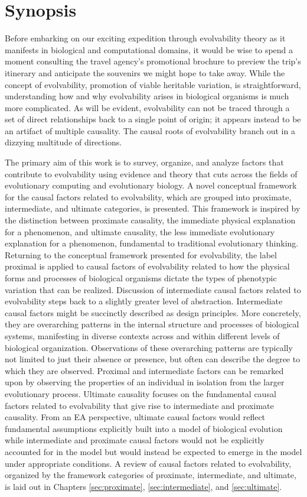 \section{Synopsis}

Before embarking on our exciting expedition through evolvability theory as it manifests in biological and computational domains, it would be wise to spend a moment consulting the travel agency's promotional brochure to preview the trip's itinerary and anticipate the souvenirs we might hope to take away.
While the concept of evolvability, promotion of viable heritable variation, is straightforward, understanding how and why evolvability arises in biological organisms is much more complicated.
As will be evident, evolvability can not be traced through a set of direct relationships back to a single point of origin; it appears instead to be an artifact of multiple causality.
The causal roots of evolvability branch out in a dizzying multitude of directions.

The primary aim of this work is to survey, organize, and analyze factors that contribute to evolvability using evidence and theory that cuts across the fields of evolutionary computing and evolutionary biology.
A novel conceptual framework for the causal factors related to evolvability,
which are grouped into proximate, intermediate, and ultimate categories, is presented.
This framework is inspired by the distinction between proximate causality, the immediate physical explanation for a phenomenon, and ultimate causality, the less immediate evolutionary explanation for a phenomenon, fundamental to traditional evolutionary thinking.
Returning to the conceptual framework presented for evolvability, the label proximal is applied to causal factors of evolvability related to how the physical forms and processes of biological organisms dictate the types of phenotypic variation that can be realized.
Discussion of intermediate causal factors related to evolvability steps back to a slightly greater level of abstraction.
Intermediate causal factors might be succinctly described as design principles.
More concretely, they are overarching patterns in the internal structure and processes of biological systems, manifesting in diverse contexts across and within different levels of biological organization.
Observations of these overarching patterns are typically not limited to just their absence or presence, but often can describe the degree to which they are observed.
Proximal and intermediate factors can be remarked upon by observing the properties of an individual in isolation from the larger evolutionary process.
Ultimate causality focuses on the fundamental causal factors related to evolvability that give rise to intermediate and proximate causality.
From an EA perspective, ultimate causal factors would reflect fundamental assumptions explicitly built into a model of biological evolution while intermediate and proximate causal factors would not be explicitly accounted for in the model but would instead be expected to emerge in the model under appropriate conditions.
A review of causal factors related to evolvability, organized by the framework categories of proximate, intermediate, and ultimate, is laid out in Chapters \ref{sec:proximate}, \ref{sec:intermediate}, and \ref{sec:ultimate}.

